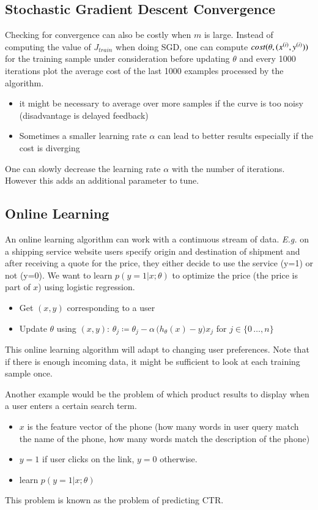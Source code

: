 \documentclass[a4paper,twoside,10pt]{article}
\begin{document}
\subsection{Stochastic Gradient Descent Convergence}
Checking for convergence can also be costly when $m$ is large.
Instead of computing the value of $J_{train}$ when doing \ac{SGD}, one can compute $cost(\theta,(x^{(i)},y^{(i)}))$ for the training sample under consideration before updating $\theta$ and every 1000 iterations plot the average cost of the last 1000 examples processed by the algorithm.
\begin{itemize}
  \item it might be necessary to average over more samples if the curve is too noisy (disadvantage is delayed feedback)
  \item Sometimes a smaller learning rate $\alpha$ can lead to better results especially if the cost is diverging
\end{itemize}
One can slowly decrease the learning rate $\alpha$ with the number of iterations. However this adds an additional parameter to tune.

\subsection{Online Learning}
An online learning algorithm can work with a continuous stream of data.
\emph{E.g.} on a shipping service website users specify origin and destination of shipment and after receiving a quote for the price, they either decide to use the service (y=1) or not (y=0). We want to learn $p(y=1|x;\theta)$ to optimize the price (the price is part of $x$) using logistic regression.
\begin{itemize}
  \item Get $(x,y)$ corresponding to a user
  \item Update $\theta$ using $(x,y)$: $\theta_j\coloneqq\theta_j-\alpha\,\big(h_\theta(x)-y)x_j$ for $j\in\{0\,\ldots,n\}$
\end{itemize}
This online learning algorithm will adapt to changing user preferences.
Note that if there is enough incoming data, it might be sufficient to look at each training sample once.

Another example would be the problem of which product results to display when a user enters a certain search term.
\begin{itemize}
  \item $x$ is the feature vector of the phone (how many words in user query match the name of the phone, how many words match the description of the phone)
  \item $y=1$ if user clicks on the link, $y=0$ otherwise.
  \item learn $p(y=1|x;\theta)$
\end{itemize}
This problem is known as the problem of predicting \ac{CTR}.
\end{document}
